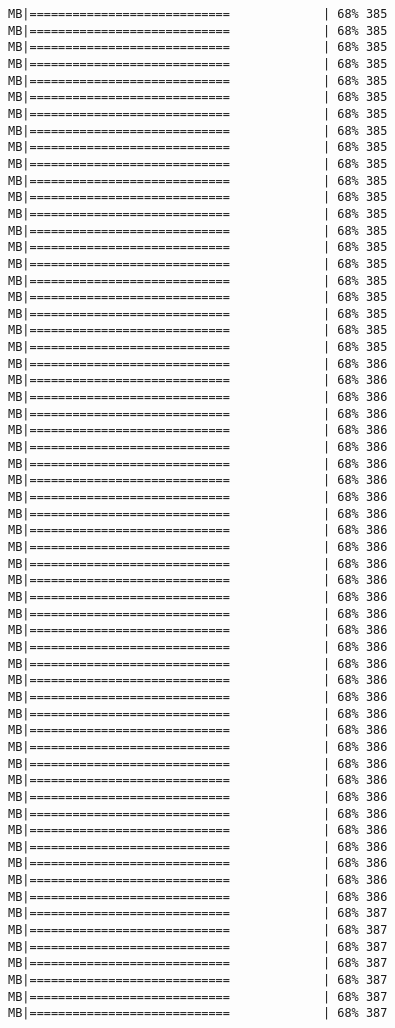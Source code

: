 \documentclass[
]{article}
\begin{document}
\begin{verbatim}
MB|============================             | 68% 385 MB|============================             | 68% 385 MB|============================             | 68% 385 MB|============================             | 68% 385 MB|============================             | 68% 385 MB|============================             | 68% 385 MB|============================             | 68% 385 MB|============================             | 68% 385 MB|============================             | 68% 385 MB|============================             | 68% 385 MB|============================             | 68% 385 MB|============================             | 68% 385 MB|============================             | 68% 385 MB|============================             | 68% 385 MB|============================             | 68% 385 MB|============================             | 68% 385 MB|============================             | 68% 385 MB|============================             | 68% 385 MB|============================             | 68% 385 MB|============================             | 68% 385 MB|============================             | 68% 385 MB|============================             | 68% 386 MB|============================             | 68% 386 MB|============================             | 68% 386 MB|============================             | 68% 386 MB|============================             | 68% 386 MB|============================             | 68% 386 MB|============================             | 68% 386 MB|============================             | 68% 386 MB|============================             | 68% 386 MB|============================             | 68% 386 MB|============================             | 68% 386 MB|============================             | 68% 386 MB|============================             | 68% 386 MB|============================             | 68% 386 MB|============================             | 68% 386 MB|============================             | 68% 386 MB|============================             | 68% 386 MB|============================             | 68% 386 MB|============================             | 68% 386 MB|============================             | 68% 386 MB|============================             | 68% 386 MB|============================             | 68% 386 MB|============================             | 68% 386 MB|============================             | 68% 386 MB|============================             | 68% 386 MB|============================             | 68% 386 MB|============================             | 68% 386 MB|============================             | 68% 386 MB|============================             | 68% 386 MB|============================             | 68% 386 MB|============================             | 68% 386 MB|============================             | 68% 386 MB|============================             | 68% 386 MB|============================             | 68% 387 MB|============================             | 68% 387 MB|============================             | 68% 387 MB|============================             | 68% 387 MB|============================             | 68% 387 MB|============================             | 68% 387 MB|============================             | 68% 387 
\end{verbatim}
\end{document}
